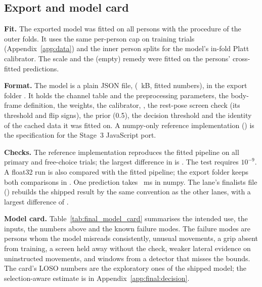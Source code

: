 \subsection{Export and model card}\label{app:final:export}

\textbf{Fit.}
The exported model was fitted on all  persons with the procedure of the outer folds.
It uses the same per-person cap on training trials (Appendix~\ref{app:data}) and the inner person splits for the model's in-fold Platt calibrator.
The scale \tauk{} and the (empty) remedy were fitted on the persons' cross-fitted predictions.

\textbf{Format.}
The model is a plain JSON file,  (~kB,  fitted numbers), in the export folder .
It holds the channel table and the preprocessing parameters, the body-frame definition, the weights, the calibrator, \tauk, the rest-pose screen check (its threshold and flip signs), the prior (0.5), the decision threshold and the identity of the cached data it was fitted on.
A numpy-only reference implementation () is the specification for the Stage~3 JavaScript port.

\textbf{Checks.}
The reference implementation reproduces the fitted pipeline on all  primary and free-choice trials; the largest difference in \pright{} is .
The test  requires $10^{-9}$.
A float32 run is also compared with the fitted pipeline; the export folder keeps both comparisons in .
One prediction takes ~ms in numpy.
The lane's finalists file () rebuilds the shipped result by the same convention as the other lanes, with a largest difference of .

\textbf{Model card.}
Table~\ref{tab:final_model_card} summarises the intended use, the inputs, the numbers above and the known failure modes.
The failure modes are persons whom the model misreads consistently, unusual movements, a grip absent from training, a screen held away without the check, weaker lateral evidence on uninstructed movements, and windows from a detector that misses the bounds.
The card's LOSO numbers are the exploratory ones of the shipped model; the selection-aware estimate is in Appendix~\ref{app:final:decision}.

